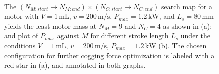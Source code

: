     
    \begin{figure}[h]
    \centering
    \\
    \caption{The $\left(N_{M:start}\rightarrow N_{M:end}\right)\times\left(N_{C:start}\rightarrow N_{C:end}\right)$  search map for a motor with $V = 1\,\mathrm{mL}$, $v = 200\,\mathrm{m/s}$,  $P_{max} = 1.2\,\mathrm{kW}$, and $L_s = 80\,\mathrm{mm}$ yields the least motor mass at $N_M = 9$ and $N_C = 4$ as shown in (a); and plot of $P_{max}$ against $M$ for different stroke length $L_s$ under the conditions $V = 1\,\mathrm{mL}$, $v = 200\,\mathrm{m/s}$,  $P_{max} = 1.2\,\mathrm{kW}$ (b). The chosen configuration for further cogging force optimization is labeled with a red star in (a), and annotated in both graphs. }
    \end{figure}


